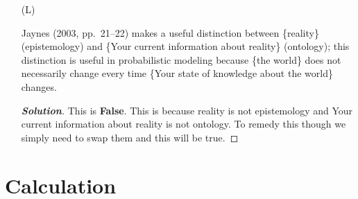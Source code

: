 \documentclass[12pt]{article}
\newenvironment{solution}{\begin{proof}[\textbf{\textit{Solution}}] }{\end{proof}}
\begin{document}
\begin{itemize}
\item[(L)]

Jaynes (2003, pp.~21--22) makes a useful distinction between
\{reality\} (epistemology) and \{Your current information about reality\}
(ontology); this distinction is useful in probabilistic modeling because
\{the world\} does not necessarily change every time \{Your state of
knowledge about the world\} changes.
\begin{tcolorbox}[breakable]
    \begin{solution}
        This is \textbf{False}. This is because reality is not epistemology and Your current information about reality is not ontology. To remedy this though we simply need to swap them and this will be true.
    \end{solution}
\end{tcolorbox}


\end{itemize}

\section{Calculation}
\end{document}
